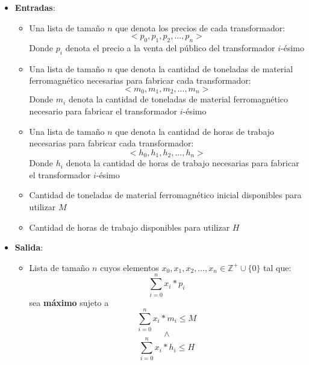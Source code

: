 \documentclass[12pt]{article}
\begin{document}
\begin{enumerate}[label=\alph*]
\begin{itemize}
\item \textbf{Entradas}:
\begin{itemize}
\item Una lista de tamaño $n$ que denota los precios de cada transformador:
\begin{equation*}
<p_{0}, p_{1}, p_{2}, ..., p_{n}>
\end{equation*}
Donde $p_{i}$ denota el precio a la venta del público del transformador $i$-ésimo
\item Una lista de tamaño $n$ que denota la cantidad de toneladas de material ferromagnético necesarias para fabricar cada transformador:
\begin{equation*}
<m_{0}, m_{1}, m_{2}, ..., m_{n}>
\end{equation*}
Donde $m_{i}$ denota la cantidad de toneladas de material ferromagnético necesario para fabricar el transformador $i$-ésimo
\item Una lista de tamaño $n$ que denota la cantidad de horas de trabajo necesarias para fabricar cada transformador:
\begin{equation*}
<h_{0}, h_{1}, h_{2}, ..., h_{n}>
\end{equation*}
Donde $h_{i}$ denota la cantidad de horas de trabajo necesarias para fabricar el transformador $i$-ésimo
\item Cantidad de toneladas de material ferromagnético inicial disponibles para utilizar $M$
\item Cantidad de horas de trabajo disponibles para utilizar $H$
\end{itemize}
\item \textbf{Salida}:
\begin{itemize}
\item Lista de tamaño $n$ cuyos elementos $x_{0}, x_{1}, x_{2}, ..., x_{n} \in \mathbb{Z}^{+} \cup \{0\}$ tal que:
\begin{equation*}
\sum_{i=0}^{n} x_{i} * p_{i}
\end{equation*}
sea \textbf{máximo} sujeto a
\begin{equation*}
\sum_{i=0}^{n} x_{i} * m_{i} \leq M
\end{equation*}
\begin{equation*}
\land
\end{equation*}
\begin{equation*}
\sum_{i=0}^{n} x_{i} * h_{i} \leq H
\end{equation*}
\end{itemize}
\end{itemize}


\end{enumerate}
\end{document}
